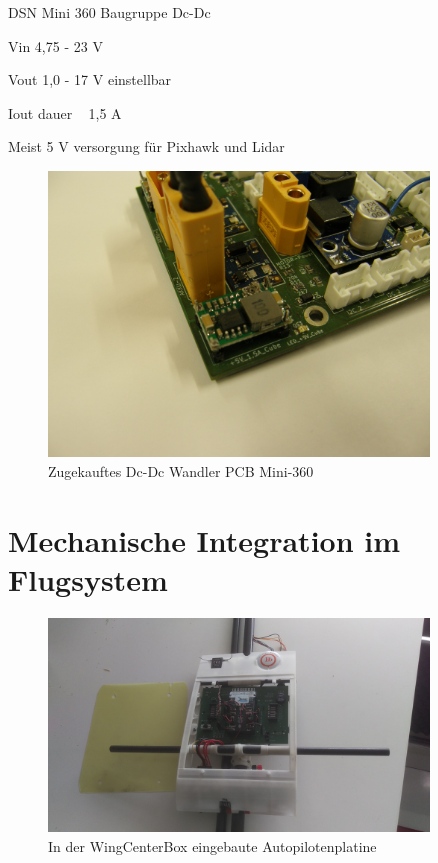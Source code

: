 DSN Mini 360  Baugruppe Dc-Dc

Vin 4,75 - 23 V

Vout 1,0 - 17 V einstellbar

Iout dauer  ~ 1,5 A

Meist 5 V versorgung für Pixhawk und Lidar

\begin{figure}[H]
\centering
\includegraphics[width=0.9\textwidth]{bilder/Zukaufbauteile/Baugruppen_Dc-Dc_Mini-360.jpg} 
\caption{Zugekauftes Dc-Dc Wandler PCB Mini-360} 
\label{fig:Zugekauftes Dc-Dc Wandler PCB Mini-360}
\end{figure}

\section{Mechanische Integration im Flugsystem}

\begin{figure}[H]
\centering
\includegraphics[width=0.9\textwidth]{bilder/Fotos/AUVSI_2016_Centerbox_Detail.jpg} 
\caption{In der WingCenterBox eingebaute Autopilotenplatine} 
\label{fig:In der WingCenterBox eingebaute Autopilotenplatine}
\end{figure}